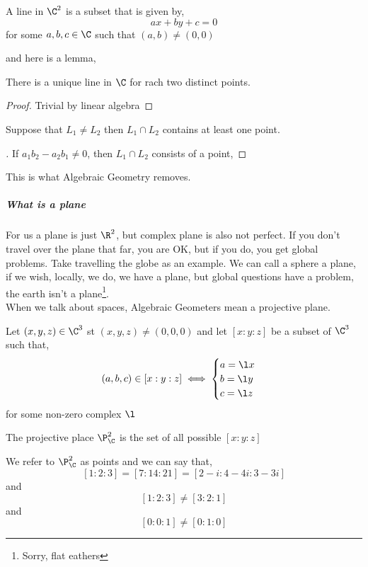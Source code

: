 \documentclass{article}
\begin{document}
\begin{ndefi}[Line]
  A line in $\C^2$ is a subset that is given by,
  $$ ax + by + c = 0 $$
  for some $a, b, c \in \C$ such that $(a, b) \ne (0, 0)$
\end{ndefi}

and here is a lemma,
\begin{nlemma}[]
  There is a unique line in $\C$ for rach two distinct points.
\end{nlemma}
\begin{proof}
  Trivial by linear algebra
\end{proof}

\begin{nlemma}[]
  Suppose that $L_1 \ne L_2$ then $L_1 \cap L_2$ contains at least one point.
\end{nlemma}
\begin{proof}[]
  If $a_1b_2 - a_2b_1 \ne 0$, then $L_1 \cap L_2$ consists of a point,
\end{proof}

This is what Algebraic Geometry removes.

\subparagraph{What is a plane}
For us a plane is just $\R^2$, but complex plane is also not perfect. If you don't travel over the plane that far, you are OK, but if you do, you get global problems. Take travelling the globe as an example. We can call a sphere a plane, if we wish, locally, we do, we have a plane, but global questions have a problem, the earth isn't a plane\footnote{Sorry, flat eathers}.\\


When we talk about spaces, Algebraic Geometers mean a projective plane.

\begin{ndefi}
  Let $(x, y, z) \in \C^3$ st $(x, y, z) \ne (0, 0, 0)$ and let $[x : y : z]$ be a subset of $\C^3$ such that,
  $$ (a, b, c) \in [x : y : z] \iff \begin{cases}
    a = \l x\\
    b = \l y\\
    c = \l z
  \end{cases} $$
  for some non-zero complex $\l$
\end{ndefi}

\begin{ndefi}[]
  The projective place $\P^2_\C$ is the set of all possible $[x : y : z]$
\end{ndefi}

We refer to $\P_\C^2$ as points and we can say that,
$$ [1 : 2 : 3] = [7 : 14 : 21] = [2 - i : 4 - 4i : 3 - 3i] $$
and
$$ [1 : 2 : 3] \ne [3 : 2 : 1] $$
and
$$ [0 : 0 : 1] \ne [0 : 1 : 0] $$
\end{document}
